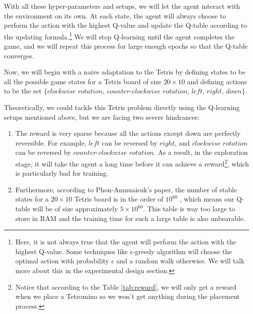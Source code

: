 \documentclass[letterpaper]{article} %
\begin{document}
With all these hyper-parameters and setups, we will let the agent interact with the environment on its own. At each state, the agent will always choose to perform the action with the highest Q-value and update the Q-table according to the updating formula.\footnote{Here, it is not always true that the agent will perform the action with the highest Q-value. Some techniques like $\epsilon$-greedy algorithm will choose the optimal action with probability $\epsilon$ and a random walk otherwise. We will talk more about this in the experimental design section.} We will stop Q-learning until the agent completes the game, and we will repeat this process for large enough epochs so that the Q-table converges.

Now, we will begin with a naive adaptation to the Tetris by defining states to be all the possible game states for a Tetris board of size $20\times 10$ and defining actions to be the set $\{clockwise\,\,rotation$, $counter\textit{-}clockwise\,\,rotation$, $left$, $right$, $down\}$.

Theoretically, we could tackle this Tetris problem directly using the Q-learning setups mentioned above, but we are facing two severe hindrances:
\begin{enumerate}
  \item The reward is very sparse because all the actions except down are perfectly reversible. For example, $left$ can be reversed by $right$, and $clockwise\,\,rotation$ can be reversed by $counter\textit{-}clockwise\,\,rotation$. As a result, in the exploration stage, it will take the agent a long time before it can achieve a reward\footnote{Notice that according to the Table \ref{tab:reward}, we will only get a reward when we place a Tetromino so we won't get anything during the placement process.}, which is particularly bad for training. {}
  \item Furthermore, according to Phon-Amnuaisuk's paper, the number of stable states for a $20\times 10$ Tetris board is in the order of $10^{60}$ \cite{somnuk_2015}, which means our Q-table will be of size approximately $5\times 10^{60}$. This table is way too large to store in RAM and the training time for such a large table is also unbearable.
\end{enumerate}
\end{document}
